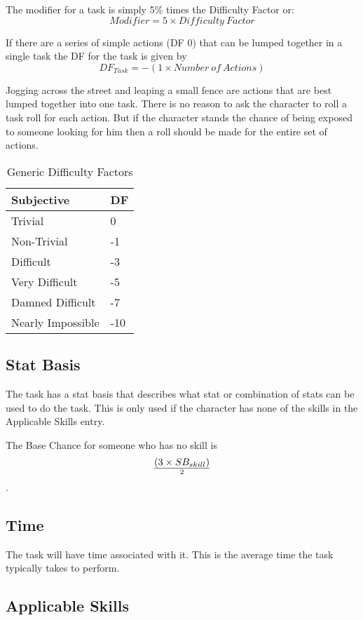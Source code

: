 The modifier for a task is simply 5\% times the Difficulty Factor or:
\[ Modifier = 5 \times {Difficulty\ Factor} \]

If there are a series of simple actions (DF 0) that can be lumped 
together in a single task the DF for the task is given by \[ DF_{Task} =  - ( 1
\times {Number\ of\ Actions }) \]  

Jogging across the street and leaping a small fence are actions that 
are best lumped together into one task. There is no reason 
to ask the character to roll a task roll for each action. 
But if the character stands the chance of being exposed to
someone looking for him then a roll should be made for the entire set 
of actions. 

\begin{table}[h]
	\begin{tabular}{l|l}
	Subjective						& DF \\
	\hline
	Trivial			&  0 \\
	Non-Trivial	 	&  -1 \\
	Difficult		&  -3 \\
	Very Difficult  & -5 \\ 
	Damned Difficult & -7 \\
   	Nearly Impossible & -10 \\
	\end{tabular}
    \caption{Generic Difficulty Factors}
\end{table}

\subsection{Stat Basis}

The task has a stat basis that describes what stat or combination of 
stats can be used to do the task. This is only used if the character 
has none of the skills in the Applicable Skills entry. 

The Base Chance for someone who has no skill is 
\[ (3 \times SB_{skill}) \over {2} \]. 

\subsection{Time}

The task will have time associated with it. This is the average time 
the task typically takes to perform. 

\subsection{Applicable Skills}

